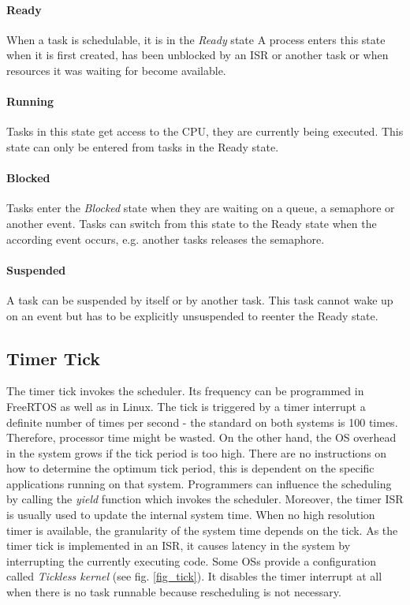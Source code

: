 \paragraph{Ready}
When a task is schedulable, it is in the \textit{Ready} state  
A process enters this state when it is first created, has been unblocked by an \ac{ISR} or another task or when resources it was waiting for become available.

\paragraph{Running}
Tasks in this state get access to the \ac{CPU}, they are currently being executed.
This state can only be entered from tasks in the Ready state.

\paragraph{Blocked}
Tasks enter the \textit{Blocked} state when they are waiting on a queue, a semaphore or another event.
Tasks can switch from this state to the Ready state when the according event occurs, e.g. another tasks releases the semaphore.

\paragraph{Suspended}
A task can be suspended by itself or by another task. 
This task cannot wake up on an event but has to be explicitly unsuspended to reenter the Ready state.  

\subsection{Timer Tick}\label{ss_timer_tick}
The timer tick invokes the scheduler.
Its frequency can be programmed in FreeRTOS as well as in Linux.
The tick is triggered by a timer interrupt a definite number of times per second - the standard on both systems is 100 times. 
Therefore, processor time might be wasted.
On the other hand, the \ac{OS} overhead in the system grows if the tick period is too high.
There are no instructions on how to determine the optimum tick period, this is dependent on the specific applications running on that system. 
Programmers can influence the scheduling by calling the \textit{yield} function which invokes the scheduler.
Moreover, the timer \ac{ISR} is usually used to update the internal system time. 
When no high resolution timer is available, the granularity of the system time depends on the tick.
As the timer tick is implemented in an \ac{ISR}, it causes latency in the system by interrupting the currently executing code. 
Some \acp{OS} provide a configuration called \textit{Tickless kernel} (see fig. \ref{fig_tick}).
It disables the timer interrupt at all when there is no task runnable because rescheduling is not necessary.

